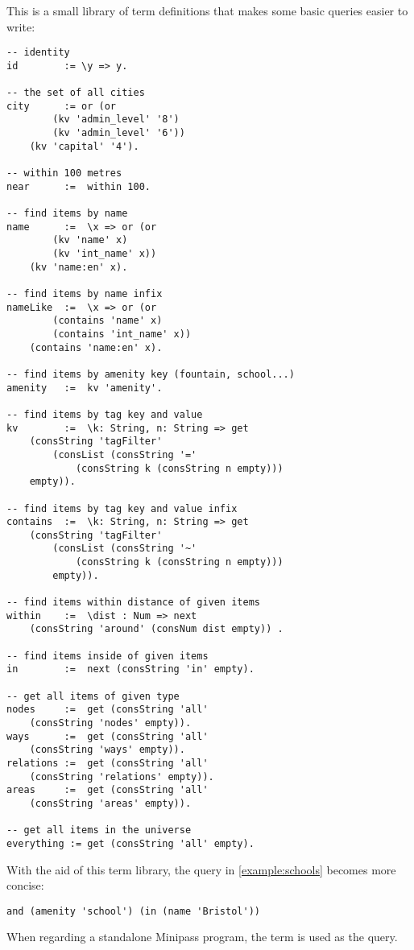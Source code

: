 \documentclass[main.tex]{subfiles}
\begin{document}
This is a small library of term definitions that makes some basic queries
easier to write:
\begin{lstwrap}\begin{lstlisting}
-- identity
id        := \y => y.

-- the set of all cities
city      := or (or
        (kv 'admin_level' '8')
        (kv 'admin_level' '6'))
    (kv 'capital' '4').

-- within 100 metres
near      :=  within 100.

-- find items by name
name      :=  \x => or (or
        (kv 'name' x)
        (kv 'int_name' x))
    (kv 'name:en' x).

-- find items by name infix
nameLike  :=  \x => or (or
        (contains 'name' x)
        (contains 'int_name' x))
    (contains 'name:en' x).

-- find items by amenity key (fountain, school...)
amenity   :=  kv 'amenity'.

-- find items by tag key and value
kv        :=  \k: String, n: String => get
    (consString 'tagFilter'
        (consList (consString '='
            (consString k (consString n empty)))
    empty)).

-- find items by tag key and value infix
contains  :=  \k: String, n: String => get
    (consString 'tagFilter'
        (consList (consString '~'
            (consString k (consString n empty)))
        empty)).

-- find items within distance of given items
within    :=  \dist : Num => next
    (consString 'around' (consNum dist empty)) .

-- find items inside of given items
in        :=  next (consString 'in' empty).

-- get all items of given type
nodes     :=  get (consString 'all'
    (consString 'nodes' empty)).
ways      :=  get (consString 'all'
    (consString 'ways' empty)).
relations :=  get (consString 'all'
    (consString 'relations' empty)).
areas     :=  get (consString 'all'
    (consString 'areas' empty)).

-- get all items in the universe
everything := get (consString 'all' empty).
\end{lstlisting}\end{lstwrap}

\begin{example}
    With the aid of this term library, the query in \cref{example:schools}
    becomes more concise:

    \begin{lstwrap}\begin{lstlisting}
and (amenity 'school') (in (name 'Bristol'))
    \end{lstlisting}\end{lstwrap}
\end{example}

When regarding a standalone Minipass program, the term  is used
as the query.
\end{document}
